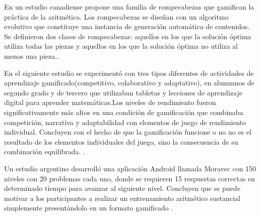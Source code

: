 \documentclass{article}
\begin{document}
En un estudio canadiense propone una familia de rompecabezas que gamifican la práctica de la aritmética. Los rompecabezas se diseñan con un algoritmo evolutivo que constituye una instancia de generación automática de contenidos. Se definieron dos clases de rompecabezas: aquellos en los que la solución óptima utiliza todas las piezas y aquellos en los que la solución óptima no utiliza al menos una pieza.\cite{foxcroft2020polyomino}.

En el siguiente estudio se experimentó con tres tipos diferentes de actividades de aprendizaje gamificado(competitivo, colaborativo y adaptativo), en alummnos de segundo grado y de tercero que utilizaban tabletas y lecciones de aprendizaje digital para aprender matemáticas.Los niveles de rendimiento fueron significativamente más altos en una condición de gamificación que combinaba competición, narrativa y adaptabilidad con elementos de juego de rendimiento individual. Concluyen con el hecho de que la gamificación funcione o no no es el resultado de los elementos individuales del juego, sino la consecuencia de su combinación equilibrada. \cite{jaguvst2018examining}.
 
Un estudio argentino desarrolló una aplicación Android llamada Moravec con 150 niveles con 20 problemas cada uno, donde se requieren 15 respuestas correctas en determinado tiempo para avanzar al siguiente nivel. Concluyen que se puede motivar a los participantes a realizar un entrenamiento aritmético sustancial simplemente presentándolo en un formato gamificado \cite{zimmerman2016arithmetic}.
\end{document}

